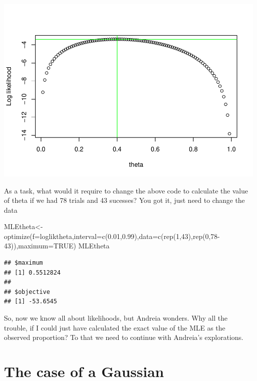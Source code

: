 \documentclass[
]{book}
\newenvironment{Shaded}{\begin{snugshade}}{\end{snugshade}}
\newcommand{\AttributeTok}[1]{\textcolor[rgb]{0.77,0.63,0.00}{#1}}
\newcommand{\ConstantTok}[1]{\textcolor[rgb]{0.00,0.00,0.00}{#1}}
\newcommand{\DecValTok}[1]{\textcolor[rgb]{0.00,0.00,0.81}{#1}}
\newcommand{\FloatTok}[1]{\textcolor[rgb]{0.00,0.00,0.81}{#1}}
\newcommand{\FunctionTok}[1]{\textcolor[rgb]{0.00,0.00,0.00}{#1}}
\newcommand{\NormalTok}[1]{#1}
\newcommand{\OtherTok}[1]{\textcolor[rgb]{0.56,0.35,0.01}{#1}}
\begin{document}
\includegraphics{ECOMODbook_files/figure-latex/ch13.16-1.pdf}

As a task, what would it require to change the above code to calculate the value of theta if we had 78 trials and 43 sucesses? You got it, just need to change the data

\begin{Shaded}
\begin{Highlighting}[]
\NormalTok{MLEtheta}\OtherTok{\textless{}{-}}\FunctionTok{optimize}\NormalTok{(}\AttributeTok{f=}\NormalTok{logliktheta,}\AttributeTok{interval=}\FunctionTok{c}\NormalTok{(}\FloatTok{0.01}\NormalTok{,}\FloatTok{0.99}\NormalTok{),}\AttributeTok{data=}\FunctionTok{c}\NormalTok{(}\FunctionTok{rep}\NormalTok{(}\DecValTok{1}\NormalTok{,}\DecValTok{43}\NormalTok{),}\FunctionTok{rep}\NormalTok{(}\DecValTok{0}\NormalTok{,}\DecValTok{78{-}43}\NormalTok{)),}\AttributeTok{maximum=}\ConstantTok{TRUE}\NormalTok{)}
\NormalTok{MLEtheta}
\end{Highlighting}
\end{Shaded}

\begin{verbatim}
## $maximum
## [1] 0.5512824
## 
## $objective
## [1] -53.6545
\end{verbatim}

So, now we know all about likelihoods, but Andreia wonders. Why all the trouble, if I could just have calculated the exact value of the MLE as the observed proportion? To that we need to continue with Andreia's explorations.

\hypertarget{the-case-of-a-gaussian}{%
\section{The case of a Gaussian}\label{the-case-of-a-gaussian}}
\end{document}
